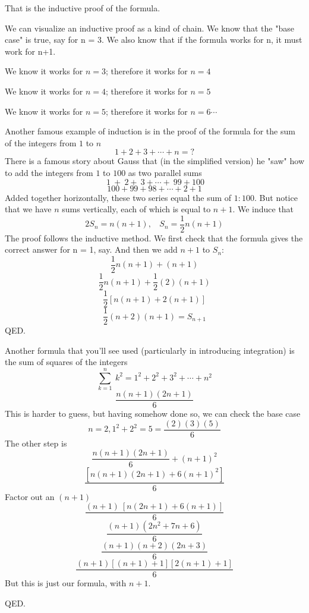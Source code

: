 \documentclass[11pt, oneside]{article}   	%
\begin{document}
That is the inductive proof of the formula.

We can visualize an inductive proof as a kind of chain.  We know that the "base case" is true, say for n = 3.  We also know that if the formula works for n, it must work for n+1.
\vspace{2mm}

We know it works for $n = 3$;  therefore it works for $n = 4$
\vspace{2mm}

We know it works for $n = 4$;  therefore it works for $n = 5$
\vspace{2mm}

We know it works for $n = 5$;  therefore it works for $n = 6 \cdots$
\vspace{2mm}

Another famous example of induction is in the proof of the formula for the sum of the integers from $1$ to $n$
\[  1 + 2 + 3 + \cdots + n = ?  \]
There is a famous story about Gauss that (in the simplified version) he "saw" how to add the integers from $1$ to $100$ as two parallel sums
\[  \ 1 \ + \ 2 + \ 3 + \cdots + \ 99 + 100 \]
\[ 100 + 99 + 98 + \cdots + 2 + 1 \]
Added together horizontally, these two series equal the sum of $1:100$.  But notice that we have $n$ sums vertically, each of which is equal to $n+1$.  We induce that
\[ 2S_n = n (n+1), \ \ \ \  S_n = \frac{1}{2}n(n+1)\]
The proof follows the inductive method.  We first check that the formula gives the correct answer for n = 1, say.  
And then we add $n+1$ to $S_n$:
\[ \frac{1}{2} n (n+1) + (n+1) \]
\[ \frac{1}{2} n (n+1) + \frac{1}{2} (2) (n+1) \]
\[ \frac{1}{2}[n(n+1) + 2(n+1)] \]
\[ \frac{1}{2}(n+2)(n+1) = S_{n+1}\]
QED.
\vspace{2mm}

Another formula that you'll see used (particularly in introducing integration) is the sum of squares of the integers 
\[ \sum_{k=1}^{n} \ k^2 = 1^2 + 2^2 + 3^2 + \cdots + n^2 \]
\[ \frac{n(n+1)(2n+1)}{6} \]
This is harder to guess, but having somehow done so, we can check the base case
\[ n = 2, 1^2 + 2^2 = 5 = \frac{(2)(3)(5)}{6} \]
The other step is 
\[ \frac{n(n+1)(2n+1)}{6} + (n+1)^2 \]
\[ \frac{[n(n+1)(2n+1) + 6(n+1)^2]}{6} \]
Factor out an $(n+1)$
\[ \frac{(n+1) \ [n(2n+1) + 6(n+1)]}{6} \]
\[ \frac{(n+1)(2n^2 + 7n + 6)}{6} \]
\[ \frac{(n+1)(n+2)(2n+3)}{6} \]
\[ \frac{(n+1)[(n+1)+1][2(n+1)+1]}{6} \]
But this is just our formula, with $n+1$.

\noindent QED.
\end{document}
